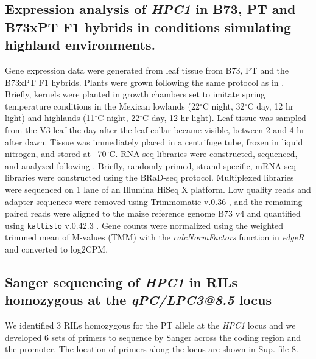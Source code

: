 \documentclass[9pt,twocolumn,twoside,lineno]{biorxiv}
\newcommand{\hpc}{\textit{HPC1}\xspace}
\begin{document}
\subsection{Expression analysis of \hpc in B73, PT and B73xPT F1 hybrids in conditions simulating highland environments.}
Gene expression data were generated from leaf tissue from B73, PT and the B73xPT F1 hybrids. 
Plants were grown following the same protocol as in \cite{Crow2020-gene}.
Briefly, kernels were planted in growth chambers set to imitate spring temperature conditions in the Mexican lowlands (22$^{\circ}$C night, 32$^{\circ}$C day, 12 hr light) and highlands (11$^{\circ}$C night, 22$^{\circ}$C day, 12 hr light). 
Leaf tissue was sampled from the V3 leaf the day after the leaf collar became visible, between 2 and 4 hr after dawn. 
Tissue was immediately placed in a centrifuge tube, frozen in liquid nitrogen, and stored at --70$^{\circ}$C.
RNA-seq libraries were constructed, sequenced, and analyzed following \cite{Crow2020-gene}. 
Briefly, randomly primed, strand specific, mRNA-seq libraries were constructed using the BRaD-seq \cite{townsley2015brad} protocol.
Multiplexed libraries were sequenced on 1 lane of an Illumina HiSeq X platform. 
Low quality reads and adapter sequences were removed using Trimmomatic v.0.36 \cite{bolger2014trimmomatic}, and the remaining paired reads were aligned to the maize reference genome B73 v4 and quantified using \texttt{kallisto} v.0.42.3 \cite{bray2016near}. 
Gene counts were normalized using the weighted trimmed mean of M-values (TMM) with the \textit{calcNormFactors} function in \textit{edgeR} \cite{robinson2010edger} and converted to log2CPM.
\subsection{Sanger sequencing of \hpc in RILs homozygous at the \textit{qPC/LPC3@8.5} locus}
We identified 3 RILs homozygous for the PT allele at the \hpc locus and we developed 6 sets of primers to sequence by Sanger across the coding region and the promoter. 
The location of primers along the locus are shown in Sup. file 8. 
\end{document}
